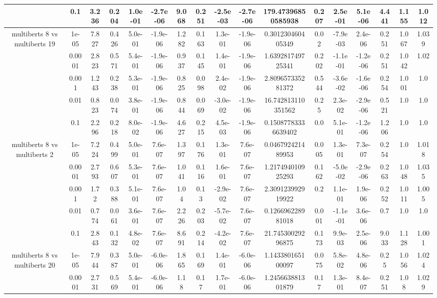 \begin{tabular}{|c|c|c|c|c|c|c|c|c|c|c|c|c|c|c|c|c|}
 & 0.1 & 3.236 & 0.204 & 1.0e-01 & -2.7e-06 & 9.068 & 0.251 & -2.5e-03 & -2.7e-06 & 179.47396850585938 & 0.207 & 2.5e-01 & 5.1e-06 & 4.441 & 1.155 & 1.012 \\
\hline
\multirow{5}{*}{multiberts 8 vs multiberts 19} & 1e-05 & 7.827 & 0.426 & 5.0e-01 & -1.9e-06 & 1.282 & 0.163 & 1.3e-01 & -1.9e-06 & 0.301230460405349 & 0.02 & -7.9e-03 & 2.4e-06 & 0.251 & 1.067 & 1.039 \\
 & 0.0001 & 2.823 & 0.571 & 5.4e-01 & -1.9e-06 & 0.937 & 0.145 & 1.4e-01 & -1.9e-06 & 1.639281749725341 & 0.202 & -1.1e-01 & -1.2e-06 & 0.251 & 1.042 & 1.02 \\
 & 0.001 & 1.243 & 0.238 & 5.3e-01 & -1.9e-06 & 0.825 & 0.098 & 2.4e-02 & -1.9e-06 & 2.809657335281372 & 0.544 & -3.6e-02 & -1.6e-06 & 0.254 & 1.001 & 1.0 \\
 & 0.01 & 0.823 & 0.074 & 3.8e-01 & -1.9e-06 & 0.844 & 0.069 & -3.0e-02 & -1.9e-06 & 16.742813110351562 & 0.25 & 2.3e-02 & -2.9e-06 & 0.521 & 1.0 & 1.0 \\
 & 0.1 & 2.296 & 0.218 & 8.0e-02 & -1.9e-06 & 4.627 & 0.215 & 4.5e-03 & -1.9e-06 & 0.15087783336639402 & 0.0 & 5.1e-01 & -1.2e-06 & 1.206 & 1.0 & 1.0 \\
\hline
\multirow{5}{*}{multiberts 8 vs multiberts 2} & 1e-05 & 7.224 & 0.499 & 5.0e-01 & 7.6e-07 & 1.397 & 0.176 & 1.3e-01 & 7.6e-07 & 0.046792421489953 & 0.005 & 1.3e-01 & 7.3e-07 & 0.254 & 1.0 & 1.018 \\
 & 0.0001 & 2.793 & 0.607 & 5.3e-01 & 7.6e-07 & 1.041 & 0.116 & 1.6e-01 & 7.6e-07 & 1.217494010925293 & 0.162 & -5.0e-02 & -2.9e-06 & 0.263 & 1.048 & 1.035 \\
 & 0.001 & 1.72 & 0.388 & 5.1e-01 & 7.6e-07 & 1.04 & 0.13 & -2.9e-02 & 7.6e-07 & 2.309123992919922 & 0.2 & 1.1e-01 & 1.9e-06 & 0.252 & 1.011 & 1.005 \\
 & 0.01 & 0.774 & 0.061 & 3.6e-01 & 7.6e-07 & 2.226 & 0.203 & -5.7e-02 & 7.6e-07 & 0.126696228981018 & 0.001 & -1.1e-01 & 3.6e-06 & 0.7 & 1.0 & 1.0 \\
 & 0.1 & 2.843 & 0.132 & 4.8e-02 & 7.6e-07 & 8.691 & 0.214 & -4.2e-02 & 7.6e-07 & 21.74530029296875 & 0.173 & 9.9e-03 & 2.5e-06 & 9.033 & 1.128 & 1.001 \\
\hline
\multirow{5}{*}{multiberts 8 vs multiberts 20} & 1e-05 & 7.944 & 0.387 & 5.0e-01 & -6.0e-06 & 1.865 & 0.169 & 1.4e-01 & -6.0e-06 & 1.143380165100097 & 0.075 & 5.8e-02 & 4.8e-06 & 0.25 & 1.056 & 1.024 \\
 & 0.0001 & 2.731 & 0.569 & 5.4e-01 & -6.0e-06 & 1.18 & 0.17 & 1.7e-01 & -6.0e-06 & 1.245663881301879 & 0.17 & 1.3e-01 & 8.4e-07 & 0.251 & 1.08 & 1.029 \\

\end{tabular}
